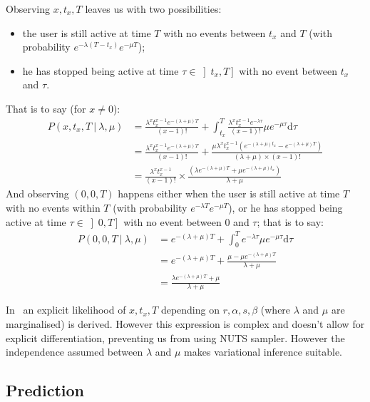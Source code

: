 \documentclass{tufte-book}
\begin{document}
Observing $x,t_x, T$ leaves us with two possibilities:
\begin{itemize}
\item the user is still active at time $T$ with no events between
  $t_x$ and $T$ (with probability $e^{-\lambda (T-t_x)} e^{-\mu T}$);
\item he has stopped being active at time
  $\tau \in \left] t_x, T \right]$ with no event between $t_x$ and
  $\tau$.
\end{itemize}
That is to say (for $x\ne 0$):
\begin{align*}
  P(x,t_x,T \ |\ \lambda, \mu)
  & = \frac{\lambda^x t_x^{x-1}
    e^{-(\lambda + \mu) T}}{(x-1)!} + \int_{t_x}^T \frac{\lambda^x
    t_x^{x-1} e^{-\lambda\tau}}{(x-1)!} \mu e^{-\mu \tau}
    \mathrm{d}\tau \\
  & = \frac{\lambda^x t_x^{x-1} e^{-(\lambda + \mu)
    T}}{(x-1)!}  + \frac{\mu\lambda^x t_x^{x-1} \left(
    e^{-(\lambda+\mu)t_x} -e^{-(\lambda+\mu)T}\right)}{(\lambda + \mu)
    \times(x-1)!}\\
  & = \frac{\lambda^x t_x^{x-1}}{(x-1)!} \times
    \frac{ \left( \lambda
    e^{-(\lambda+\mu)T}+ \mu e^{-(\lambda+\mu)t_x} \right)}{\lambda + \mu}
\end{align*}
And observing $(0,0,T)$ happens either when the user is still active at
time $T$ with no events within $T$ (with probability
$e^{-\lambda T} e^{-\mu T}$), or he has stopped being active at
time $\tau \in \left ] 0, T \right]$ with no event between $0$ and
$\tau$; that is to say:
\begin{align*}
  P(0,0,T \ |\ \lambda, \mu)
  & =  e^{-(\lambda + \mu) T}  + \int_{0}^T  e^{-\lambda\tau}    \mu e^{-\mu \tau}
    \mathrm{d}\tau \\
  & =  e^{-(\lambda + \mu) T} + \frac{\mu - \mu e^{-(\lambda+\mu)T}}{\lambda+\mu} \\
  & = \frac{\lambda e^{-(\lambda+\mu)T} + \mu}{\lambda + \mu}    
\end{align*}

In~\cite{Schmittlein1987} an explicit likelihood of $x,t_x,T$
depending on $r,\alpha, s, \beta$ (where $\lambda$ and $\mu$ are
marginalised) is derived. However this expression is
complex and doesn't allow for explicit differentiation, preventing us
from using NUTS sampler. However the independence assumed between
$\lambda$ and $\mu$ makes variational inference suitable.


\subsection{Prediction}
\label{sub:prediction_pareto_nbd}
\end{document}

